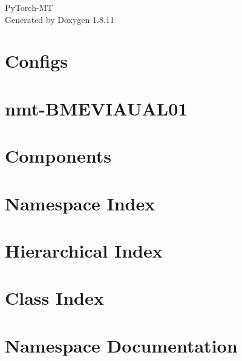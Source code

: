 \documentclass[twoside]{book}
\newcommand{\+}{\discretionary{\mbox{\scriptsize$\hookleftarrow$}}{}{}}
\newcommand{\clearemptydoublepage}{%
  \newpage{\pagestyle{empty}\cleardoublepage}%
}
\begin{document}
\hypersetup{pageanchor=false,
             bookmarksnumbered=true,
             pdfencoding=unicode
            }
\begin{titlepage}
\vspace*{7cm}
\begin{center}%
{\Large Py\+Torch-\/\+MT }\\
\vspace*{1cm}
{\large Generated by Doxygen 1.8.11}\\
\end{center}
\end{titlepage}
\clearemptydoublepage
\tableofcontents
\clearemptydoublepage
{}
\hypersetup{pageanchor=true}

\chapter{Configs}
\label{md_configs_README}
\hypertarget{md_configs_README}{}

\chapter{nmt-\/\+B\+M\+E\+V\+I\+A\+U\+A\+L01}
\label{md_README}
\hypertarget{md_README}{}

\chapter{Components}
\label{md_src_components_README}
\hypertarget{md_src_components_README}{}

\chapter{Namespace Index}

\chapter{Hierarchical Index}

\chapter{Class Index}

\chapter{Namespace Documentation}



















\end{document}
